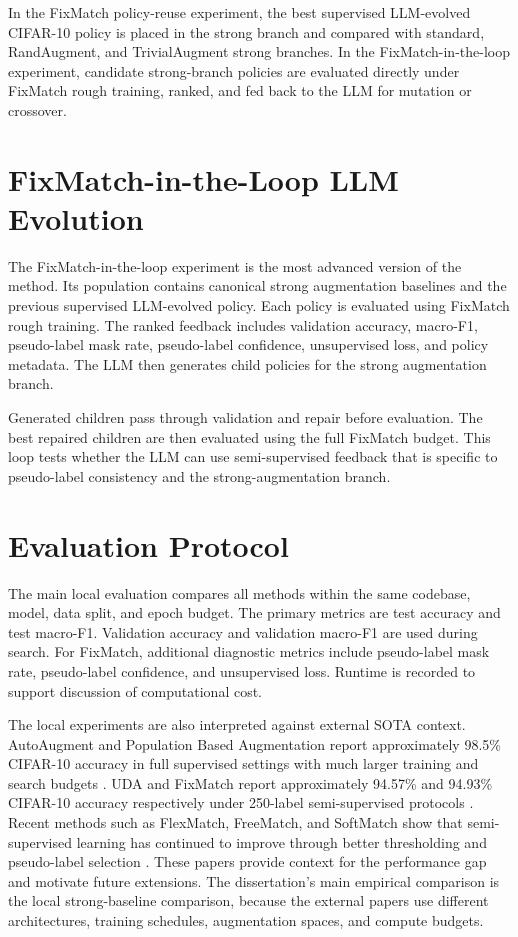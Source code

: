 \documentclass[12pt,a4paper]{report}
\begin{document}
In the FixMatch policy-reuse experiment, the best supervised LLM-evolved CIFAR-10 policy is placed in the strong branch and compared with standard, RandAugment, and TrivialAugment strong branches. In the FixMatch-in-the-loop experiment, candidate strong-branch policies are evaluated directly under FixMatch rough training, ranked, and fed back to the LLM for mutation or crossover.

\section{FixMatch-in-the-Loop LLM Evolution}

The FixMatch-in-the-loop experiment is the most advanced version of the method. Its population contains canonical strong augmentation baselines and the previous supervised LLM-evolved policy. Each policy is evaluated using FixMatch rough training. The ranked feedback includes validation accuracy, macro-F1, pseudo-label mask rate, pseudo-label confidence, unsupervised loss, and policy metadata. The LLM then generates child policies for the strong augmentation branch.

Generated children pass through validation and repair before evaluation. The best repaired children are then evaluated using the full FixMatch budget. This loop tests whether the LLM can use semi-supervised feedback that is specific to pseudo-label consistency and the strong-augmentation branch.

\section{Evaluation Protocol}

The main local evaluation compares all methods within the same codebase, model, data split, and epoch budget. The primary metrics are test accuracy and test macro-F1. Validation accuracy and validation macro-F1 are used during search. For FixMatch, additional diagnostic metrics include pseudo-label mask rate, pseudo-label confidence, and unsupervised loss. Runtime is recorded to support discussion of computational cost.

The local experiments are also interpreted against external SOTA context. AutoAugment and Population Based Augmentation report approximately 98.5\% CIFAR-10 accuracy in full supervised settings with much larger training and search budgets \citep{cubuk2019autoaugment,ho2019population}. UDA and FixMatch report approximately 94.57\% and 94.93\% CIFAR-10 accuracy respectively under 250-label semi-supervised protocols \citep{xie2020uda,sohn2020fixmatch}. Recent methods such as FlexMatch, FreeMatch, and SoftMatch show that semi-supervised learning has continued to improve through better thresholding and pseudo-label selection \citep{zhang2021flexmatch,wang2023freematch,chen2023softmatch}. These papers provide context for the performance gap and motivate future extensions. The dissertation's main empirical comparison is the local strong-baseline comparison, because the external papers use different architectures, training schedules, augmentation spaces, and compute budgets.
\end{document}
